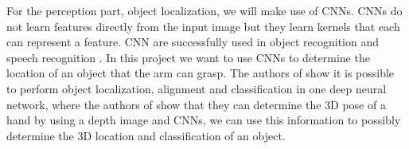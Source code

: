 For the perception part, object localization, we will make use of CNNs. CNNs do not learn features directly from the input image but they learn kernels that each can represent a feature. CNN are successfully used in 
object recognition and speech recognition \cite{sainath2015deep}. In this project we want to use CNNs to determine the location of an object that the arm can grasp. The authors of \cite{lin2015deep} show it is possible to 
perform object localization, alignment and classification in one deep neural network, where the authors of \cite{oberweger2015hands} show that they can determine the 3D pose of a hand by using a depth image and CNNs, 
we can use this information to possibly determine the 3D location and classification of an object. 

 
